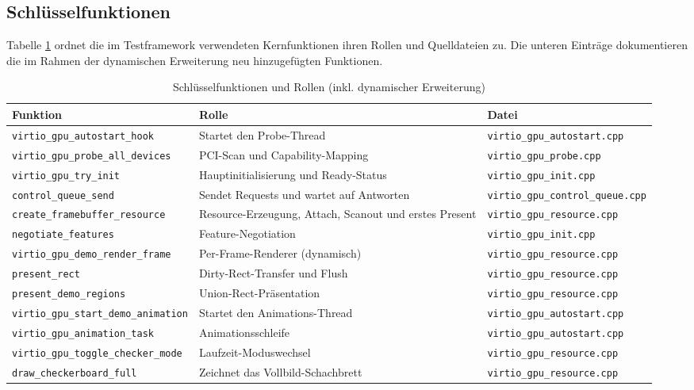 \subsection{Schlüsselfunktionen}

Tabelle \ref{tab:virtio_functions} ordnet die im Testframework verwendeten
Kernfunktionen ihren Rollen und Quelldateien zu. Die unteren Einträge
dokumentieren die im Rahmen der dynamischen Erweiterung neu hinzugefügten
Funktionen.

\begin{table}[ht]
\centering
\caption{Schlüsselfunktionen und Rollen (inkl. dynamischer Erweiterung)}
\label{tab:virtio_functions}
\begin{tabular}{l l l}
\toprule
\textbf{Funktion} & \textbf{Rolle} & \textbf{Datei} \\ \midrule
\texttt{virtio\_gpu\_autostart\_hook} & Startet den Probe-Thread & \texttt{virtio\_gpu\_autostart.cpp} \\
\texttt{virtio\_gpu\_probe\_all\_devices} & PCI-Scan und Capability-Mapping & \texttt{virtio\_gpu\_probe.cpp} \\
\texttt{virtio\_gpu\_try\_init} & Hauptinitialisierung und Ready-Status & \texttt{virtio\_gpu\_init.cpp} \\
\texttt{control\_queue\_send} & Sendet Requests und wartet auf Antworten & \texttt{virtio\_gpu\_control\_queue.cpp} \\
\texttt{create\_framebuffer\_resource} & Resource-Erzeugung, Attach, Scanout und erstes Present & \texttt{virtio\_gpu\_resource.cpp} \\
\texttt{negotiate\_features} & Feature-Negotiation & \texttt{virtio\_gpu\_init.cpp} \\
\texttt{virtio\_gpu\_demo\_render\_frame} & Per-Frame-Renderer (dynamisch) & \texttt{virtio\_gpu\_resource.cpp} \\
\texttt{present\_rect} & Dirty-Rect-Transfer und Flush & \texttt{virtio\_gpu\_resource.cpp} \\
\texttt{present\_demo\_regions} & Union-Rect-Präsentation & \texttt{virtio\_gpu\_resource.cpp} \\
\texttt{virtio\_gpu\_start\_demo\_animation} & Startet den Animations-Thread & \texttt{virtio\_gpu\_autostart.cpp} \\
\texttt{virtio\_gpu\_animation\_task} & Animationsschleife & \texttt{virtio\_gpu\_autostart.cpp} \\
\texttt{virtio\_gpu\_toggle\_checker\_mode} & Laufzeit-Moduswechsel & \texttt{virtio\_gpu\_resource.cpp} \\
\texttt{draw\_checkerboard\_full} & Zeichnet das Vollbild-Schachbrett & \texttt{virtio\_gpu\_resource.cpp} \\ \bottomrule
\end{tabular}
\end{table}


